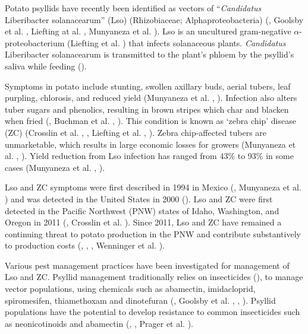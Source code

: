 \documentclass{UIdahoMastersThesis}
\begin{document}
Potato psyllids have recently been identified as vectors of “\textit{Candidatus} Liberibacter solanacearum” (Lso) (Rhizobiaceae; Alphaproteobacteria) (\cite{Cicero2016}, Goolsby et al. \citeyear{Goolsby2007a}, Liefting at al. \citeyear{Liefting2009}, Munyaneza et al. \citeyear{Munyaneza2007a}). Lso is an uncultured gram-negative $\alpha$-proteobacterium (Liefting et al. \citeyear{Liefting2009}) that infects solanaceous plants. \textit{Candidatus} Liberibacter solanacearum is transmitted to the plant’s phloem by the psyllid’s saliva while feeding (\cite{Cooper2014}).

Symptoms in potato include stunting, swollen axillary buds, aerial tubers, leaf purpling, chlorosis, and reduced yield (Munyaneza et al. \citeyear{Munyaneza2007a}, \citeyear{Munyaneza2008}). Infection also alters tuber sugars and phenolics, resulting in brown stripes which char and blacken when fried (\cite{Alvarado2012}, Buchman et al. \citeyear{Buchman2012}, \cite{Navarre2009}). This condition is known as ‘zebra chip’ disease (ZC) (Crosslin et al. \citeyear{Crosslin2011}, \cite{Hansen2008}, Liefting et al. \citeyear{Liefting2009}, \cite{Lin2009}).  Zebra chip-affected tubers are unmarketable, which results in large economic losses for growers (Munyaneza et al. \citeyear{Munyaneza2007a}, \cite{Rosson2006}). Yield reduction from Lso infection has ranged from 43\% to 93\% in some cases (Munyaneza et al. \citeyear{Munyaneza2008}, \citeyear{Munyaneza2011}).

Lso and ZC symptoms were first described in 1994 in Mexico (\cite{Secor2004}, Munyaneza et al. \citeyear{Munyaneza2009}) and was detected in the United States in 2000 (\cite{Secor2004}). Lso and ZC were first detected in the Pacific Northwest (PNW) states of Idaho, Washington, and Oregon in 2011 (\cite{Murphy2012}, Crosslin et al. \citeyear{Crosslin2012}). Since 2011, Lso and ZC have remained a continuing threat to potato production in the PNW and contribute substantively to production costs (\cite{Greenway2014}, \cite{Greenway2018}, \cite{Guenthner2012}, Wenninger et al. \citeyear{Wenninger2017}).

Various pest management practices have been investigated for management of Lso and ZC. Psyllid management traditionally relies on insecticides (\cite{Echegaray2017}), to manage vector populations, using chemicals such as abamectin, imidacloprid, spiromesifen, thiamethoxam and dinotefuran (\cite{Gharalari2009}, Goolsby et al. \citeyear{Goolsby2007b}, \cite{Guenthner2012}, \cite{Vega-Gutierrez2008}). Psyllid populations have the potential to develop resistance to common insecticides such as neonicotinoids and abamectin (\cite{Hernandez-Bautista2013}, \cite{Chavez2015} \cite{Liu2004}, Prager et al. \citeyear{Prager2013}).
\end{document}
